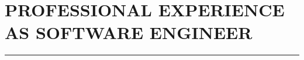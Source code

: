 \documentclass[a4paper,oneside,12pt]{article}
\newcommand{\cvpart}[1]{%
\vspace{-1em}%
\section*{\large\bfseries\MakeTextUppercase{#1}}%
\vspace{-1em}%
\rule{\linewidth}{0.3em}\\[-.3em]%
}
\begin{document}
~\\



\cvpart{Professional Experience as Software Engineer}


\end{document}
